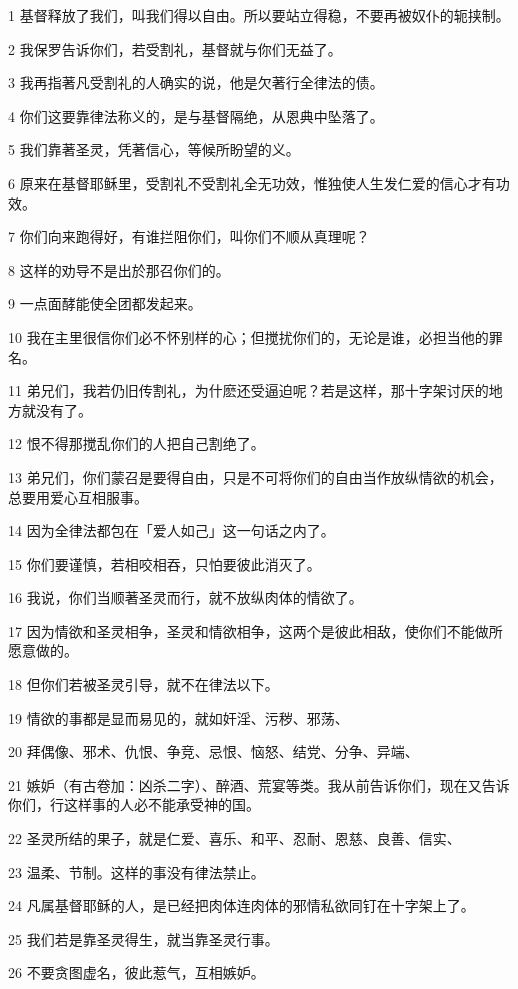 \par 1 基督释放了我们，叫我们得以自由。所以要站立得稳，不要再被奴仆的轭挟制。
\par 2 我保罗告诉你们，若受割礼，基督就与你们无益了。
\par 3 我再指著凡受割礼的人确实的说，他是欠著行全律法的债。
\par 4 你们这要靠律法称义的，是与基督隔绝，从恩典中坠落了。
\par 5 我们靠著圣灵，凭著信心，等候所盼望的义。
\par 6 原来在基督耶稣里，受割礼不受割礼全无功效，惟独使人生发仁爱的信心才有功效。
\par 7 你们向来跑得好，有谁拦阻你们，叫你们不顺从真理呢？
\par 8 这样的劝导不是出於那召你们的。
\par 9 一点面酵能使全团都发起来。
\par 10 我在主里很信你们必不怀别样的心；但搅扰你们的，无论是谁，必担当他的罪名。
\par 11 弟兄们，我若仍旧传割礼，为什麽还受逼迫呢？若是这样，那十字架讨厌的地方就没有了。
\par 12 恨不得那搅乱你们的人把自己割绝了。
\par 13 弟兄们，你们蒙召是要得自由，只是不可将你们的自由当作放纵情欲的机会，总要用爱心互相服事。
\par 14 因为全律法都包在「爱人如己」这一句话之内了。
\par 15 你们要谨慎，若相咬相吞，只怕要彼此消灭了。
\par 16 我说，你们当顺著圣灵而行，就不放纵肉体的情欲了。
\par 17 因为情欲和圣灵相争，圣灵和情欲相争，这两个是彼此相敌，使你们不能做所愿意做的。
\par 18 但你们若被圣灵引导，就不在律法以下。
\par 19 情欲的事都是显而易见的，就如奸淫、污秽、邪荡、
\par 20 拜偶像、邪术、仇恨、争竞、忌恨、恼怒、结党、分争、异端、
\par 21 嫉妒（有古卷加：凶杀二字）、醉酒、荒宴等类。我从前告诉你们，现在又告诉你们，行这样事的人必不能承受神的国。
\par 22 圣灵所结的果子，就是仁爱、喜乐、和平、忍耐、恩慈、良善、信实、
\par 23 温柔、节制。这样的事没有律法禁止。
\par 24 凡属基督耶稣的人，是已经把肉体连肉体的邪情私欲同钉在十字架上了。
\par 25 我们若是靠圣灵得生，就当靠圣灵行事。
\par 26 不要贪图虚名，彼此惹气，互相嫉妒。

